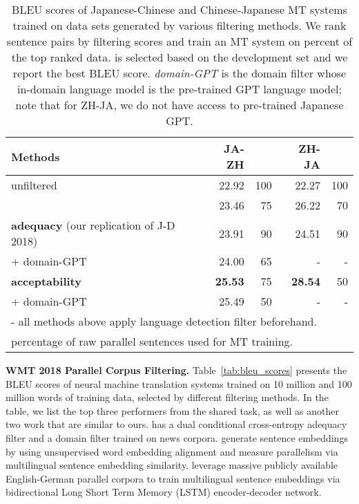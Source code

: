\documentclass[11pt,a4paper]{article}
\begin{document}
\begin{table*}[h]
    \centering
    \begin{tabular}{lrrrr}
        \textbf{Methods} & \textbf{JA-ZH} &   & \textbf{ZH-JA} &   \\
        \hline
        unfiltered & 22.92 & 100 & 22.27 & 100 \\
        \citet{chaudhary2019low} & 23.46 & 75 & 26.22  & 70 \\
        \hline 
        \textbf{adequacy} (our replication of J-D 2018) & 23.91 & 90 & 24.51 & 90 \\
        \hspace{2mm} + domain-GPT & 24.00 & 65 & - & - \\
        \hline
        \textbf{acceptability} & \textbf{25.53} & 75 &  \textbf{28.54} & 50 \\
        \hspace{2mm} + domain-GPT  & 25.49 & 50 & - & - \\
        \hline
        \multicolumn{4}{p{0.7\textwidth}}{\small - all methods above apply language detection filter beforehand.}\\
        \multicolumn{4}{p{0.7\textwidth}}{\small * percentage of raw parallel sentences used for MT training.}\\
    \end{tabular}
    \caption{BLEU scores of Japanese-Chinese and Chinese-Japanese MT systems trained on data sets generated by various filtering methods. We rank sentence pairs by filtering scores and train an MT system on  percent of the top ranked data.  is selected based on the development set and we report the best BLEU score. {\em domain-GPT} is the domain filter whose in-domain language model is the pre-trained GPT language model; note that for ZH-JA, we do not have access to pre-trained Japanese GPT.}
    \label{tab:ja-zh}
\end{table*}

\textbf{WMT 2018 Parallel Corpus Filtering.} 
Table~\ref{tab:bleu_scores} presents the BLEU scores of neural machine translation systems trained on 10 million and 100 million words of training data, selected by different filtering methods.
In the table, we list the top three performers from the shared task, as well as another two work that are similar to ours.
\citet{junczys2018dual} has a dual conditional cross-entropy adequacy filter and a domain filter trained on news corpora.
\citet{hangya2018unsupervised} generate sentence embeddings by using unsupervised word embedding alignment and measure parallelism via multilingual sentence embedding similarity.
\citet{chaudhary2019low} leverage massive publicly available English-German parallel corpora to train multilingual sentence embeddings via bidirectional Long Short Term Memory (LSTM) encoder-decoder network.
\end{document}
